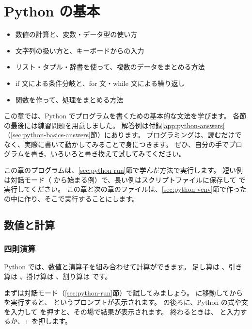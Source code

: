\chapter{Python の基本}
\label{chap:python_basics}

\begin{goalbox}
  \begin{itemize}
    \item 数値の計算と、変数・データ型の使い方
    \item 文字列の扱い方と、キーボードからの入力
    \item リスト・タプル・辞書を使って、複数のデータをまとめる方法
    \item if 文による条件分岐と、for 文・while 文による繰り返し
    \item 関数を作って、処理をまとめる方法
  \end{itemize}
\end{goalbox}

この章では、Python でプログラムを書くための基本的な文法を学びます。
各節の最後には練習問題を用意しました。
解答例は付録\ref{app:python-answers}（\ref{sec:python-basics-answers}節）にあります。
プログラミングは、読むだけでなく、実際に書いて動かしてみることで身につきます。
ぜひ、自分の手でプログラムを書き、いろいろと書き換えて試してみてください。

\begin{point}[この章のプログラムの実行方法]
  この章のプログラムは、\ref{sec:python-run}節で学んだ方法で実行します。
  短い例は対話モード（\cmd{>>>} から始まる例）で、長い例はスクリプトファイルに保存して  で実行してください。
  この章と次の章のファイルは、\ref{sec:python-venv}節で作った  の中に作り、そこで実行することにします。
\end{point}

\section{数値と計算}
\label{sec:python-basics-number}

\subsection{四則演算}

Python では、数値と演算子を組み合わせて計算ができます。
足し算は \cmd{+}、引き算は \cmd{-}、掛け算は \cmd{*}、割り算は \cmd{/} です。

まずは対話モード（\ref{sec:python-run}節）で試してみましょう。
 に移動してから  を実行すると、\cmd{>>>} というプロンプトが表示されます。
\cmd{>>>} の後ろに、Python の式や文を入力して  を押すと、その場で結果が表示されます。
終わるときは、 と入力するか、+ を押します。

